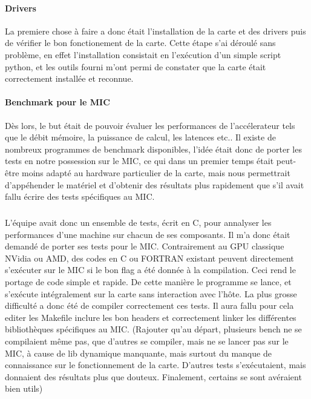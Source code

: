 \documentclass{article}
\begin{document}
				\paragraph{Drivers}
				La premiere chose à faire a donc était l'installation de la carte et des drivers puis de vérifier le bon
				fonctionement de la carte. Cette étape s'ai déroulé sans problème, en effet l'installation consistait en 
				l'exécution d'un simple script python, et les outils fourni m'ont permi de constater que la carte était
				correctement installée et reconnue.
				\paragraph{Benchmark pour le MIC}
				Dès lors, le but était de pouvoir évaluer les performances de l'accélerateur tels que le débit mémoire,
				la puissance de calcul, les latences etc.. \newline
				Il existe de nombreux programmes de benchmark disponibles, l'idée était donc de porter les tests en notre
				possession sur le MIC, ce qui dans un premier temps était peut-être moins adapté au hardware particulier
				de la carte, mais nous permettrait d'appéhender le matériel et d'obtenir des résultats plus rapidement 
				que s'il avait fallu écrire des tests spécifiques au MIC.
					\subparagraph{}
					L'équipe avait donc un ensemble de tests, écrit en C, pour annalyser les performances d'une machine sur 
					chacun de ses composants. Il m'a donc était demandé de porter ses tests pour le MIC. \newline
					Contrairement au GPU classique NVidia ou AMD, des codes en C ou FORTRAN existant peuvent directement
					s'exécuter sur le MIC si le bon flag a été donnée à la compilation. Ceci rend le portage de code
					simple et rapide. De cette manière le programme se lance, et s'exécute intégralement sur la carte
					sans interaction avec l'hôte.\newline
					La plus grosse difficulté a donc été de compiler correctement ces tests. Il aura fallu pour cela editer 
					les Makefile inclure les bon headers et correctement linker les différentes bibliothèques spécifiques au 
					MIC. (Rajouter qu'au départ, plusieurs bench ne se compilaient même pas, que d'autres se compiler, 
					mais ne se lancer pas sur le MIC, à cause de lib dynamique manquante, mais surtout du manque de 
					connaissance sur le fonctionnement de la carte. D'autres tests s'exécutaient, mais donnaient des résultats 
					plus que douteux. Finalement, certains se sont avéraient bien utils) \newline
\end{document}
